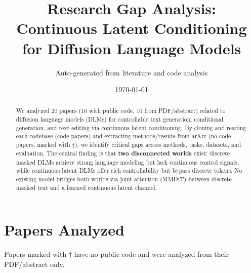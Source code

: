 \documentclass{article}
\title{Research Gap Analysis: Continuous Latent Conditioning\\for Diffusion Language Models}
\author{Auto-generated from literature and code analysis}
\date{\today}
\begin{document}
\maketitle

\begin{abstract}
We analyzed 20 papers (10 with public code, 10 from PDF/abstract) related to diffusion language models (DLMs) for controllable text generation, conditional generation, and text editing via continuous latent conditioning. By cloning and reading each codebase (code papers) and extracting methods/results from arXiv (no-code papers, marked with $\dagger$), we identify critical gaps across methods, tasks, datasets, and evaluation. The central finding is that \textbf{two disconnected worlds} exist: discrete masked DLMs achieve strong language modeling but lack continuous control signals, while continuous latent DLMs offer rich controllability but bypass discrete tokens. No existing model bridges both worlds via joint attention (MMDiT) between discrete masked text and a learned continuous latent channel.
\end{abstract}

\section{Papers Analyzed}

\noindent Papers marked with $\dagger$ have no public code and were analyzed from their PDF/abstract only.
\end{document}
